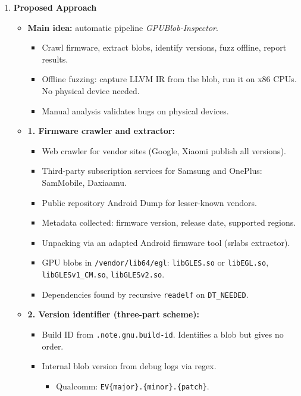 \documentclass[11pt,a4paper]{article}
\newcommand{\entrypart}[1]{\textbf{\color{accent}#1}\par\vspace{2pt}}
\begin{document}
\begin{enumerate}
    \item \entrypart{Proposed Approach}
    \begin{itemize}[leftmargin=*, itemsep=1pt, topsep=2pt]
        \item \textbf{Main idea:} automatic pipeline \emph{GPUBlob-Inspector}.
        \begin{itemize}[itemsep=0pt]
            \item Crawl firmware, extract blobs, identify versions, fuzz offline, report results.
            \item Offline fuzzing: capture LLVM IR from the blob, run it on x86 CPUs. No physical device needed.
            \item Manual analysis validates bugs on physical devices.
        \end{itemize}
        \item \textbf{1. Firmware crawler and extractor:}
        \begin{itemize}[itemsep=0pt]
            \item Web crawler for vendor sites (Google, Xiaomi publish all versions).
            \item Third-party subscription services for Samsung and OnePlus: SamMobile, Daxiaamu.
            \item Public repository Android Dump for lesser-known vendors.
            \item Metadata collected: firmware version, release date, supported regions.
            \item Unpacking via an adapted Android firmware tool (srlabs extractor).
            \item GPU blobs in \texttt{/vendor/lib64/egl}: \texttt{libGLES.so} or \texttt{libEGL.so}, \texttt{libGLESv1\_CM.so}, \texttt{libGLESv2.so}.
            \item Dependencies found by recursive \texttt{readelf} on \texttt{DT\_NEEDED}.
        \end{itemize}
        \item \textbf{2. Version identifier (three-part scheme):}
        \begin{itemize}[itemsep=0pt]
            \item Build ID from \texttt{.note.gnu.build-id}. Identifies a blob but gives no order.
            \item Internal blob version from debug logs via regex.
            \begin{itemize}[itemsep=0pt]
                \item Qualcomm: \texttt{EV\{major\}.\{minor\}.\{patch\}}.

\end{itemize}
\end{itemize}
\end{itemize}
\end{enumerate}
\end{document}
